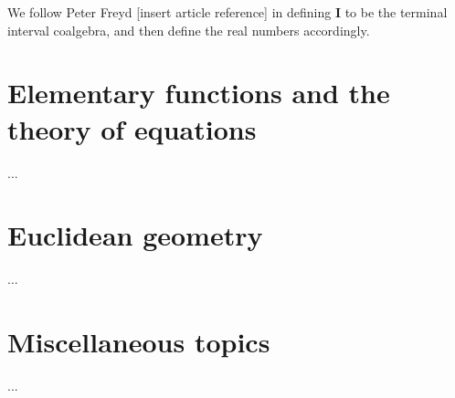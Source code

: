\documentclass[one]{article}
\begin{document}
We follow Peter Freyd [insert article reference] in defining $\mathbf{I}$ to be the terminal interval coalgebra, and then define the real numbers accordingly. 

\section{Elementary functions and the theory of equations}

...

\section{Euclidean geometry}

...

\section{Miscellaneous topics}

...
\end{document}
